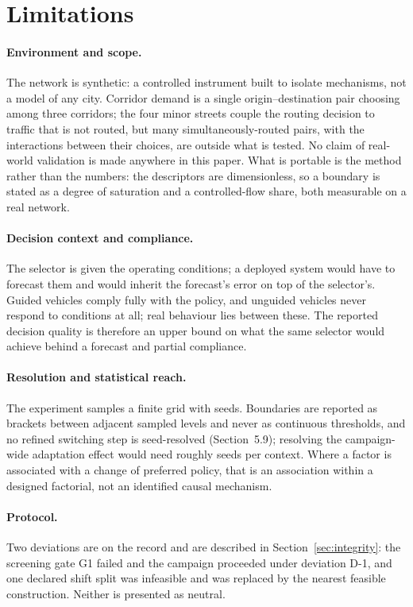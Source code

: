 \section{Limitations}

\paragraph{Environment and scope.} The network is synthetic: a controlled
instrument built to isolate mechanisms, not a model of any city. Corridor demand
is a single origin--destination pair choosing among three corridors; the four
minor streets couple the routing decision to traffic that is not routed, but
many simultaneously-routed pairs, with the interactions between their choices,
are outside what is tested. No claim of real-world validation is made anywhere
in this paper. What is portable is the method rather than the numbers: the
descriptors are dimensionless, so a boundary is stated as a degree of saturation
and a controlled-flow share, both measurable on a real network.

\paragraph{Decision context and compliance.} The selector is given the operating
conditions; a deployed system would have to forecast them and would inherit the
forecast's error on top of the selector's. Guided vehicles comply fully with the
policy, and unguided vehicles never respond to conditions at all; real behaviour
lies between these. The reported decision quality is therefore an upper bound on
what the same selector would achieve behind a forecast and partial compliance.

\paragraph{Resolution and statistical reach.} The experiment samples a finite
grid with \NumSeeds{} seeds. Boundaries are reported as brackets between
adjacent sampled levels and never as continuous thresholds, and no refined
switching step is seed-resolved (Section~5.9); resolving the campaign-wide
adaptation effect would need roughly \NumResolvSeedsNeeded{} seeds per context.
Where a factor is associated with a change of preferred policy, that is an
association within a designed factorial, not an identified causal mechanism.

\paragraph{Protocol.} Two deviations are on the record and are described in
Section~\ref{sec:integrity}: the screening gate G1 failed and the campaign proceeded under
deviation D-1, and one declared shift split was infeasible and was replaced by
the nearest feasible construction. Neither is presented as neutral.

